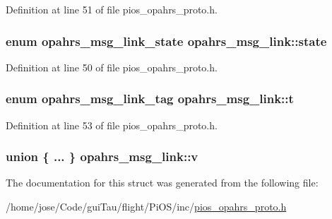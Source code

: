 Definition at line 51 of file pios\-\_\-opahrs\-\_\-proto.\-h.

\hypertarget{structopahrs__msg__link_ac08f69cb07956b7956b7cf7dae229279}{
\subsubsection[{state}]{\setlength{\rightskip}{0pt plus 5cm}enum {\bf opahrs\-\_\-msg\-\_\-link\-\_\-state} opahrs\-\_\-msg\-\_\-link\-::state}}\label{structopahrs__msg__link_ac08f69cb07956b7956b7cf7dae229279}


Definition at line 50 of file pios\-\_\-opahrs\-\_\-proto.\-h.

\hypertarget{structopahrs__msg__link_a3f0649f9d2f748da14bd963b6edb6385}{
\subsubsection[{t}]{\setlength{\rightskip}{0pt plus 5cm}enum {\bf opahrs\-\_\-msg\-\_\-link\-\_\-tag} opahrs\-\_\-msg\-\_\-link\-::t}}\label{structopahrs__msg__link_a3f0649f9d2f748da14bd963b6edb6385}


Definition at line 53 of file pios\-\_\-opahrs\-\_\-proto.\-h.

\hypertarget{structopahrs__msg__link_a3aae1545139b261339d740201c2a49e0}{
\subsubsection[{v}]{\setlength{\rightskip}{0pt plus 5cm}union \{ ... \}   opahrs\-\_\-msg\-\_\-link\-::v}}\label{structopahrs__msg__link_a3aae1545139b261339d740201c2a49e0}


The documentation for this struct was generated from the following file\-:\begin{DoxyCompactItemize}
\item 
/home/jose/\-Code/gui\-Tau/flight/\-Pi\-O\-S/inc/\hyperlink{pios__opahrs__proto_8h}{pios\-\_\-opahrs\-\_\-proto.\-h}\end{DoxyCompactItemize}
